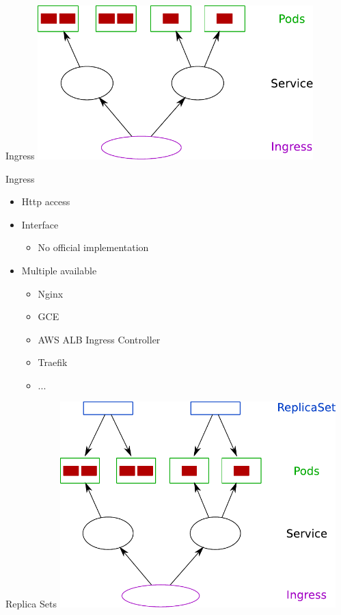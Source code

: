 \documentclass{dcpresentation}
\begin{document}

 \begin{frame}{Ingress}
  \centering
  \includegraphics[width=0.8\textwidth]{img/arch-psi.pdf}
 \end{frame}
 
 \begin{frame}{Ingress}
  \begin{itemize}
   \item Http access
   \item Interface
   \begin{itemize}
    \item No official implementation
   \end{itemize}
   \item Multiple available
   \begin{itemize}
    \item Nginx
    \item GCE
    \item AWS ALB Ingress Controller
    \item Traefik
    \item ...
   \end{itemize}
  \end{itemize}
 \end{frame}
 
 
 \begin{frame}{Replica Sets}
  \centering
  \includegraphics[width=0.8\textwidth]{img/arch-psir.pdf}
 \end{frame}
 
\end{document}
